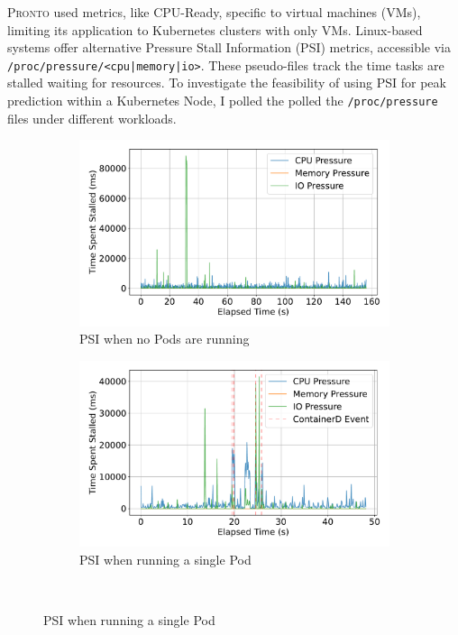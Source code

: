 \textsc{Pronto} used metrics, like CPU-Ready, specific to virtual machines
(VMs), limiting its application to Kubernetes clusters with only VMs.
Linux-based systems offer alternative Pressure Stall Information (PSI)
metrics, accessible via \texttt{/proc/pressure/<cpu|memory|io>}. These
pseudo-files track the time tasks are stalled waiting for resources. To
investigate the feasibility of using PSI for peak prediction within a Kubernetes
Node, I polled the polled the \verb|/proc/pressure| files under different
workloads.

\begin{figure}[htbp] %
    \centering %

    \begin{subfigure}[b]{0.48\textwidth} %
        \centering
        \includegraphics[width=\linewidth]{images/pressure-baseline.pdf}
        \caption{PSI when no Pods are running} %
        \label{fig:pressure-baseline} %
    \end{subfigure}%
    \hfill %
    \begin{subfigure}[b]{0.48\textwidth}
        \centering
        \includegraphics[width=\linewidth]{images/pressure-single.pdf}
        \caption{PSI when running a single Pod} %
        \label{fig:pressure-single}
    \end{subfigure}
    \\[1em] %


\end{figure}
